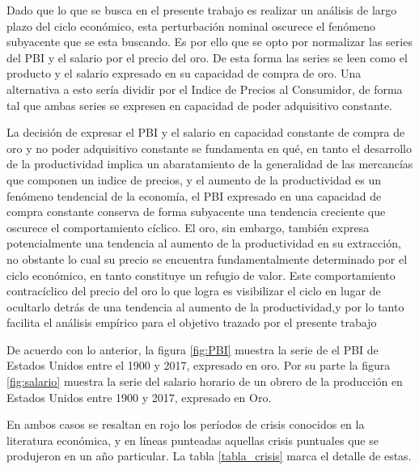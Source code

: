 \documentclass[a4paper]{article}
\begin{document}
Dado que lo que se busca en el presente trabajo es realizar un análisis de largo plazo del ciclo económico, esta perturbación nominal oscurece el fenómeno subyacente que se esta buscando. Es por ello que se opto por normalizar las series del PBI y el salario por el precio del oro. De esta forma las series se leen como el producto y el salario expresado en su capacidad de compra de oro. Una alternativa a esto sería dividir por el Indice de Precios al Consumidor, de forma tal que ambas series se expresen en capacidad de poder adquisitivo constante. 

La decisión de expresar el PBI y el salario en capacidad constante de compra de oro y no poder adquisitivo constante se fundamenta en qué, en tanto el desarrollo de la productividad implica un abaratamiento de la generalidad de las mercancías que componen un indice de precios, y el aumento de la productividad es un fenómeno tendencial de la economía, el PBI expresado en una capacidad de compra constante conserva de forma subyacente una tendencia creciente que oscurece el comportamiento cíclico. El oro, sin embargo, también expresa potencialmente una tendencia al aumento de la productividad en su extracción, no obstante lo cual su precio se encuentra fundamentalmente determinado por el ciclo económico, en tanto constituye un refugio de valor. Este comportamiento contracíclico del precio del oro lo que logra es visibilizar el ciclo en lugar de ocultarlo detrás de una tendencia al aumento de la productividad,y por lo tanto facilita el análisis empírico para el objetivo trazado por el presente trabajo

De acuerdo con lo anterior, la figura \ref{fig:PBI} muestra la serie de el PBI de Estados Unidos entre el 1900 y 2017, expresado en oro. Por su parte la figura \ref{fig:salario} muestra la serie del salario horario de un obrero de la producción en Estados Unidos entre 1900 y 2017, expresado en Oro.

 En ambos casos se resaltan en rojo los períodos de crisis conocidos en la literatura económica, y en líneas punteadas aquellas crisis puntuales que se produjeron en un año particular. La tabla \ref{tabla_crisis} marca el detalle de estas.
\end{document}
